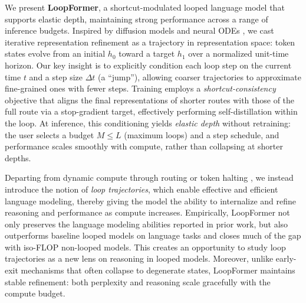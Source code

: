 We present \textbf{LoopFormer}, a shortcut-modulated looped language model that supports elastic depth, maintaining strong performance across a range of inference budgets. Inspired by diffusion models \cite{frans2024one, lu2024simplifying} and neural ODEs \cite{chen2018neural}, we cast iterative representation refinement as a trajectory in representation space: token states evolve from an initial $h_0$ toward a target $h_1$ over a normalized unit-time horizon. Our key insight is to explicitly condition each loop step on the current time $t$ and a step size $\Delta t$ (a “jump”), allowing coarser trajectories to approximate fine-grained ones with fewer steps. Training employs a \emph{shortcut-consistency} objective that aligns the final representations of shorter routes with those of the full route via a stop-gradient target, effectively performing self-distillation within the loop. At inference, this conditioning yields \emph{elastic depth} without retraining: the user selects a budget $M \le L$ (maximum loops) and a step schedule, and performance scales smoothly with compute, rather than collapsing at shorter depths.

Departing from dynamic compute through routing or token halting \cite{dehghani2018universal, bae2025mixture}, we instead introduce the notion of \emph{loop trajectories}, which enable effective and efficient language modeling, thereby giving the model the ability to internalize and refine reasoning and performance as compute increases. Empirically, LoopFormer not only preserves the language modeling abilities reported in prior work, but also outperforms baseline looped models on language tasks and closes much of the gap with iso-FLOP non-looped models. This creates an opportunity to study loop trajectories as a new lens on reasoning in looped models. Moreover, unlike early-exit mechanisms that often collapse to degenerate states, LoopFormer maintains stable refinement: both perplexity and reasoning scale gracefully with the compute budget.


